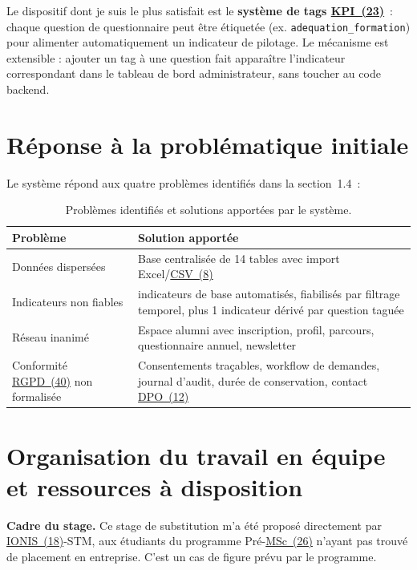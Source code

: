 \documentclass[12pt,a4paper]{report}
\begin{document}
Le dispositif dont je suis le plus satisfait est le \textbf{système de tags \hyperlink{abbr-KPI}{KPI~(23)}}~: chaque question de questionnaire peut être étiquetée (ex. \texttt{adequation\_formation}) pour alimenter automatiquement un indicateur de pilotage. Le mécanisme est extensible : ajouter un tag à une question fait apparaître l'indicateur correspondant dans le tableau de bord administrateur, sans toucher au code backend.

\section{Réponse à la problématique initiale}

Le système répond aux quatre problèmes identifiés dans la section~1.4~:

\begin{table}[htbp]
\centering
\caption{Problèmes identifiés et solutions apportées par le système.}
\label{tab:problemes-solutions}
\begin{tabularx}{\textwidth}{@{} l >{\raggedright\arraybackslash}X @{}}
\toprule
\textbf{Problème} & \textbf{Solution apportée} \\
\midrule
Données dispersées & Base centralisée de 14 tables avec import Excel/\hyperlink{abbr-CSV}{CSV~(8)} \\
Indicateurs non fiables & 8 indicateurs de base automatisés, fiabilisés par filtrage temporel, plus 1 indicateur dérivé par question taguée \\
Réseau inanimé & Espace alumni avec inscription, profil, parcours, questionnaire annuel, newsletter \\
Conformité \hyperlink{abbr-RGPD}{RGPD~(40)} non formalisée & Consentements traçables, workflow de demandes, journal d'audit, durée de conservation, contact \hyperlink{abbr-DPO}{DPO~(12)} \\
\bottomrule
\end{tabularx}
\end{table}

\section{Organisation du travail en équipe et ressources à disposition}

\textbf{Cadre du stage.} Ce stage de substitution m'a été proposé directement par \hyperlink{abbr-IONIS}{IONIS~(18)}-STM, aux étudiants du programme Pré-\hyperlink{abbr-MSc}{MSc~(26)} n'ayant pas trouvé de placement en entreprise. C'est un cas de figure prévu par le programme.
\end{document}
